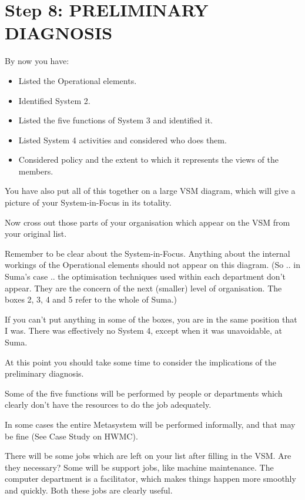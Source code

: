 \section*{Step 8: PRELIMINARY DIAGNOSIS}
By now you have:

\begin{itemize}
  \item Listed the Operational elements.

  \item Identified System 2.

  \item Listed the five functions of System 3 and identified it.

  \item Listed System 4 activities and considered who does them.

  \item Considered policy and the extent to which it represents the views of the members.

\end{itemize}

You have also put all of this together on a large VSM diagram, which will give a picture of your System-in-Focus in its totality.

Now cross out those parts of your organisation which appear on the VSM from your original list.

Remember to be clear about the System-in-Focus. Anything about the internal workings of the Operational elements should not appear on this diagram. (So .. in Suma's case .. the optimisation techniques used within each department don't appear. They are the concern of the next (smaller) level of organisation. The boxes 2, 3, 4 and 5 refer to the whole of Suma.)

If you can't put anything in some of the boxes, you are in the same position that I was. There was effectively no System 4, except when it was unavoidable, at Suma.

At this point you should take some time to consider the implications of the preliminary diagnosis.

Some of the five functions will be performed by people or departments which clearly don't have the resources to do the job adequately.

In some cases the entire Metasystem will be performed informally, and that may be fine (See Case Study on HWMC).

There will be some jobs which are left on your list after filling in the VSM. Are they necessary? Some will be support jobs, like machine maintenance. The computer department is a facilitator, which makes things happen more smoothly and quickly. Both these jobs are clearly useful.

